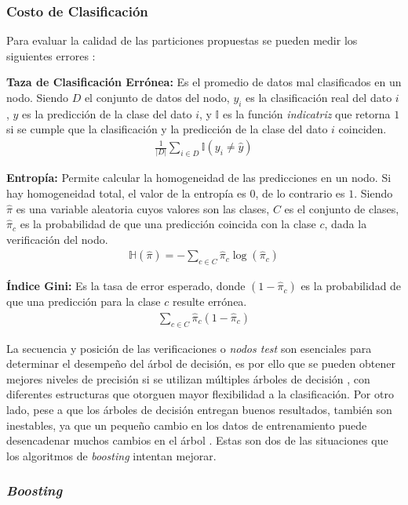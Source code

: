 \subsubsection{Costo de Clasificación}
Para evaluar la calidad de las particiones propuestas se pueden medir los siguientes errores \cite{Murphy}:

\textbf{Taza de Clasificación Errónea:} Es el promedio de datos mal clasificados en un nodo. Siendo $D$ el conjunto de datos del nodo, $y_i$ es la clasificación real del dato $i$, $\hat{y}$ es la predicción de la clase del dato $i$, y $\mathbb{I}$ es la función \textit{indicatriz} que retorna $1$ si se cumple que la clasificación y la predicción de la clase del dato $i$ coinciden.
\begin{align}
 \frac{1}{|D|} \sum_{i \in D} \mathbb{I}(y_i \neq \hat{y})
\end{align} 

\textbf{Entropía:} Permite calcular la homogeneidad de las predicciones en un nodo. Si hay homogeneidad total, el valor de la entropía es $0$, de lo contrario es $1$. Siendo $\hat{\pi}$ es una variable aleatoria cuyos valores son las clases, $C$ es el conjunto de clases, $\hat{\pi}_c$ es la probabilidad de que una predicción coincida con la clase $c$, dada la verificación del nodo.
\begin{align}
 \mathbb{H}(\hat{\pi}) = -\sum_{c \in C} \hat{\pi}_c \log(\hat{\pi}_c)
\end{align} 

\textbf{Índice Gini:} Es la tasa de error esperado, donde $(1-\hat{\pi}_c)$ es la probabilidad de que una predicción para la clase $c$ resulte errónea.
\begin{align}
 \sum_{c \in C} \hat{\pi}_c (1-\hat{\pi}_c)
\end{align} 

La secuencia y posición de las verificaciones o \emph{nodos test} son esenciales para determinar el desempeño del árbol de decisión, es por ello que se pueden obtener mejores niveles de precisión si se utilizan múltiples árboles de decisión \cite{Quinlan1996}, con diferentes estructuras que otorguen mayor flexibilidad a la clasificación. 
%
Por otro lado, pese a que los árboles de decisión entregan buenos resultados, también son inestables, ya que un pequeño cambio en los datos de entrenamiento puede desencadenar muchos cambios en el árbol \cite{Roe2005}. 
%
Estas son dos de las situaciones que los algoritmos de \textit{boosting} intentan mejorar. 
%
\subsubsection{\emph{Boosting}}

